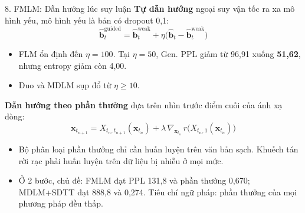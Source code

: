 \begin{frame}{8. FMLM: Dẫn hướng lúc suy luận}
    \small
    \textbf{Tự dẫn hướng} ngoại suy vận tốc ra xa mô hình yếu, mô hình yếu là bản có dropout 0,1:
    $$\hat{\mathbf{b}}_t^{\text{guided}} = \hat{\mathbf{b}}_t^{\text{weak}} + \eta\big(\hat{\mathbf{b}}_t - \hat{\mathbf{b}}_t^{\text{weak}}\big)$$
    \begin{itemize}
        \item FLM ổn định đến $\eta = 100$. Tại $\eta = 50$, Gen. PPL giảm từ 96,91 xuống \textbf{51,62}, nhưng entropy giảm còn 4,00.
        \item Duo và MDLM sụp đổ từ $\eta \ge 10$.
    \end{itemize}
    \vspace{0.1cm}
    \textbf{Dẫn hướng theo phần thưởng} dựa trên nhìn trước điểm cuối của ánh xạ dòng:
    $$\mathbf{x}_{t_{n+1}} = X_{t_n,t_{n+1}}(\mathbf{x}_{t_n}) + \lambda\,\nabla_{\mathbf{x}_{t_n}}\, r\big(X_{t_n,1}(\mathbf{x}_{t_n})\big)$$
    \begin{itemize}
        \item Bộ phân loại phần thưởng chỉ cần huấn luyện trên văn bản sạch. Khuếch tán rời rạc phải huấn luyện trên dữ liệu bị nhiễu ở mọi mức.
        \item Ở 2 bước, chủ đề: FMLM đạt PPL 131,8 và phần thưởng 0,670; MDLM+SDTT đạt 888,8 và 0,274. Tiêu chí ngữ pháp: phần thưởng của mọi phương pháp đều thấp.
    \end{itemize}
\end{frame}

